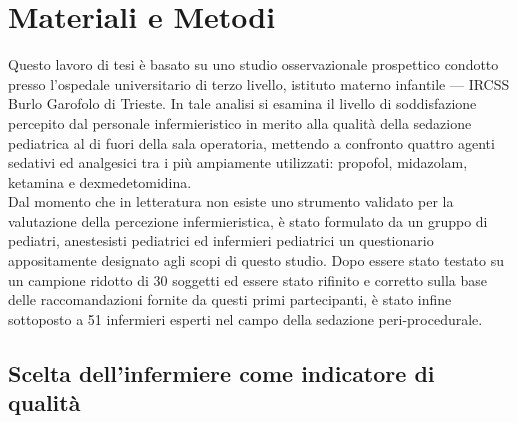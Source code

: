 \chapter{Materiali e Metodi}

Questo lavoro di tesi è basato su uno studio osservazionale prospettico condotto presso l'ospedale universitario di terzo livello, istituto materno infantile --- IRCSS Burlo Garofolo di Trieste. In tale analisi si esamina il livello di soddisfazione percepito dal personale infermieristico in merito alla qualità della sedazione pediatrica al di fuori della sala operatoria, mettendo a confronto quattro agenti sedativi ed analgesici tra i più ampiamente utilizzati: propofol, midazolam, ketamina e dexmedetomidina. 
\\Dal momento che in letteratura non esiste uno strumento validato per la valutazione della percezione infermieristica, è stato formulato da un gruppo di pediatri, anestesisti pediatrici ed infermieri pediatrici un questionario appositamente designato agli scopi di questo studio. Dopo essere stato testato su un campione ridotto di 30 soggetti ed essere stato rifinito e corretto sulla base delle raccomandazioni fornite da questi primi partecipanti, è stato infine sottoposto a 51 infermieri esperti nel campo della sedazione peri-procedurale.

\section{Scelta dell'infermiere come indicatore di qualità}

